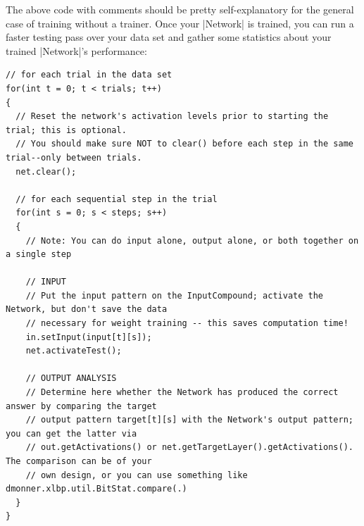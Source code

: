 \documentclass{article}
\begin{document}
The above code with comments should be pretty self-explanatory for the general case of training
without a trainer. Once your |Network| is trained, you can run a faster testing pass over your data
set and gather some statistics about your trained |Network|'s performance:

\begin{verbatim}
// for each trial in the data set
for(int t = 0; t < trials; t++)
{
  // Reset the network's activation levels prior to starting the trial; this is optional.
  // You should make sure NOT to clear() before each step in the same trial--only between trials.
  net.clear();
  
  // for each sequential step in the trial
  for(int s = 0; s < steps; s++)
  {
    // Note: You can do input alone, output alone, or both together on a single step
  
    // INPUT
    // Put the input pattern on the InputCompound; activate the Network, but don't save the data
    // necessary for weight training -- this saves computation time!
    in.setInput(input[t][s]);
    net.activateTest();
    
    // OUTPUT ANALYSIS
    // Determine here whether the Network has produced the correct answer by comparing the target
    // output pattern target[t][s] with the Network's output pattern; you can get the latter via
    // out.getActivations() or net.getTargetLayer().getActivations(). The comparison can be of your
    // own design, or you can use something like dmonner.xlbp.util.BitStat.compare(.)
  }
}
\end{verbatim}
\end{document}
